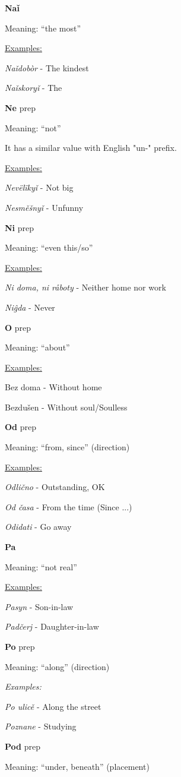 \textbf{Naǐ}

Meaning: “the most”

\underline{Examples:}

\textit{Naǐdobòr} - The kindest

\textit{Naǐskoryǐ} - The 

\textbf{Ne} \gls{prep}

Meaning: “not”

It has a similar value with English "un-" prefix.

\underline{Examples:}

\textit{Nevëlïkyǐ} - Not big

\textit{Nesměšnyǐ} - Unfunny

\textbf{Ni} \gls{prep}

Meaning: “even this/so”

\underline{Examples:}

\textit{Ni doma, ni råboty} - Neither home nor work 

\textit{Niĝda} - Never

\textbf{O}  \gls{prep}

Meaning: “about”

\underline{Examples:}

Bez doma - Without home

Bezdušen - Without soul/Soulless 

\textbf{Od} \gls{prep}

Meaning: “from, since” (direction)

\underline{Examples:}

\textit{Odlično} - Outstanding, OK

\textit{Od časa} - From the time (Since ...)

\textit{Odidati} - Go away

\textbf{Pa}

Meaning: “not real”

\underline{Examples:}

\textit{Pasyn} - Son-in-law

\textit{Padčerj} - Daughter-in-law

\textbf{Po} \gls{prep}

Meaning: “along” (direction)

\textit{Examples:}

\textit{Po ulicě} - Along the street

\textit{Poznane} - Studying

\textbf{Pod} \gls{prep}

Meaning: “under, beneath” (placement)

